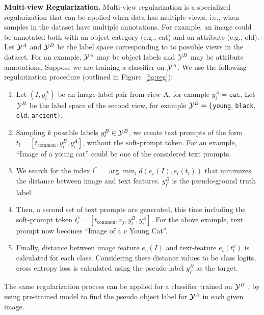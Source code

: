\documentclass[10pt,twocolumn,letterpaper]{article}
\begin{document}
\noindent \textbf{Multi-view Regularization.} Multi-view regularization is a specialized regularization that can be applied when data has multiple views, i.e., when samples in the dataset have multiple annotations. For example, an image could be annotated both with an object category (e.g., cat) and an attribute (e.g., old). Let $\mathcal{Y}^A$ and $\mathcal{Y}^B$ be the label space corresponding to to possible views in the dataset. For an example, $\mathcal{Y}^A$ may be object labels and $\mathcal{Y}^B$ may be attribute annotations.  Suppose we are training a classifier on $\mathcal{Y}^A$. We use the following regularization procedure (outlined in Figure~\ref{fig:reg}):
\begin{enumerate}
\itemsep-0.2em 
    \item Let $(I, y^A_i)$ be an image-label pair from view A, for example $y^A_i = \texttt{cat}$.
    Let $\mathcal{Y}^B$ be the label space of the second view,  for example $\mathcal{Y}^B = \{$\texttt{young}, \texttt{black}, \texttt{old}, \texttt{ancient}$\}$.
    \item Sampling $k$ possible labels $y_l^B \in \mathcal{Y}^B$, we create text prompts of the form $t_l = [ t_\text{common}, y^B_l, y^A_i ]$, without the soft-prompt token. For an example, ``Image of a young cat'' could be one of the considered text prompts.
    \item  We search for the index $l^* = \arg \min_l d(e_v(I), e_t(t_l))$  that minimizes the distance between image and text features. $y^B_{l^*}$ is the pseudo-ground truth label.
    \item Then, a second set of text prompts are generated, this time including the soft-prompt token $t_l^v = [ t_\text{common},  v_j , y^B_l, y^A_i ]$. For the above example, text prompt now becomes ``Image of a $v$ Young Cat''.
    \item Finally, distance between image feature $e_v(I)$ and text-feature $e_t(t^v_l)$ is calculated for each class. Considering these distance values to be class logits, cross entropy loss is calculated using the pseudo-label $y^B_{l^*}$ as the target.
 \end{enumerate}   
The same regularization process can be applied for a classifier trained on $\mathcal{Y}^B$ , by using pre-trained model to find the pseudo object label  for $\mathcal{Y}^A$ in each given image.
\end{document}
